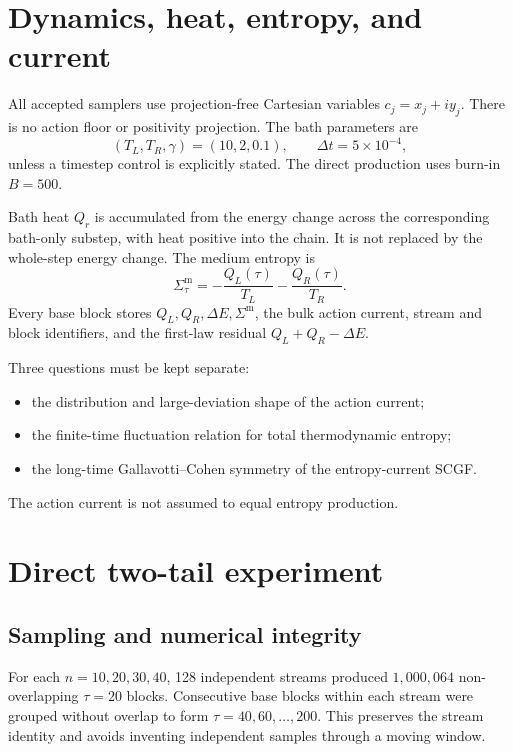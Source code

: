 \documentclass[11pt]{article}
\newcommand{\sm}{\Sigma^{\mathrm m}}
\begin{document}
\section{Dynamics, heat, entropy, and current}

All accepted samplers use projection-free Cartesian variables
$c_j=x_j+i y_j$.  There is no action floor or positivity projection.  The
bath parameters are
\begin{equation}
 (T_L,T_R,\gamma)=(10,2,0.1),\qquad \Delta t=5\times10^{-4},
\end{equation}
unless a timestep control is explicitly stated.  The direct production uses
burn-in $B=500$.

Bath heat $Q_r$ is accumulated from the energy change across the corresponding
bath-only substep, with heat positive into the chain.  It is not replaced by
the whole-step energy change.  The medium entropy is
\begin{equation}
 \sm_\tau=-\frac{Q_L(\tau)}{T_L}-\frac{Q_R(\tau)}{T_R}.
 \label{eq:medium}
\end{equation}
Every base block stores $Q_L,Q_R,\Delta E,\sm$, the bulk action current,
stream and block identifiers, and the first-law residual
$Q_L+Q_R-\Delta E$.

Three questions must be kept separate:
\begin{itemize}
\item the distribution and large-deviation shape of the action current;
\item the finite-time fluctuation relation for total thermodynamic entropy;
\item the long-time Gallavotti--Cohen symmetry of the entropy-current SCGF.
\end{itemize}
The action current is not assumed to equal entropy production.

\section{Direct two-tail experiment}

\subsection{Sampling and numerical integrity}

For each $n=10,20,30,40$, 128 independent streams produced
$1{,}000{,}064$ non-overlapping $\tau=20$ blocks.  Consecutive base blocks
within each stream were grouped without overlap to form
$\tau=40,60,\ldots,200$.  This preserves the stream identity and avoids
inventing independent samples through a moving window.
\end{document}
